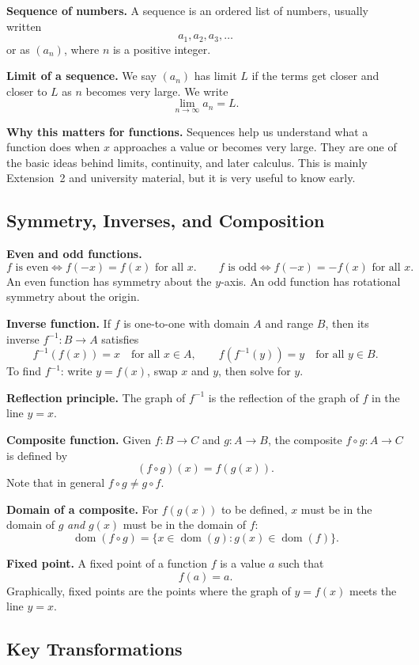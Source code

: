 \documentclass[12pt]{article}
\theoremstyle{definition}
\begin{document}
\textbf{Sequence of numbers.} A sequence is an ordered list of numbers, usually written
\[
a_1,a_2,a_3,\dots
\]
or as $(a_n)$, where $n$ is a positive integer.

\textbf{Limit of a sequence.} We say $(a_n)$ has limit $L$ if the terms get closer and closer to $L$ as $n$ becomes very large. We write
\[
\lim_{n\to\infty} a_n = L.
\]

\textbf{Why this matters for functions.} Sequences help us understand what a function does when $x$ approaches a value or becomes very large. They are one of the basic ideas behind limits, continuity, and later calculus. This is mainly Extension~2 and university material, but it is very useful to know early.

\subsection{Symmetry, Inverses, and Composition}

\textbf{Even and odd functions.}
\[
f \text{ is even} \iff f(-x) = f(x) \text{ for all } x.
\qquad
f \text{ is odd} \iff f(-x) = -f(x) \text{ for all } x.
\]
An even function has symmetry about the $y$-axis. An odd function has rotational symmetry about the origin.

\textbf{Inverse function.} If $f$ is one-to-one with domain $A$ and range $B$, then its inverse $f^{-1}: B \to A$ satisfies
\[
f^{-1}(f(x)) = x \quad \text{for all } x \in A,
\qquad
f(f^{-1}(y)) = y \quad \text{for all } y \in B.
\]
To find $f^{-1}$: write $y = f(x)$, swap $x$ and $y$, then solve for $y$.

\textbf{Reflection principle.} The graph of $f^{-1}$ is the reflection of the graph of $f$ in the line $y = x$.

\textbf{Composite function.} Given $f: B \to C$ and $g: A \to B$, the composite $f \circ g: A \to C$ is defined by
\[
(f \circ g)(x) = f(g(x)).
\]
Note that in general $f \circ g \neq g \circ f$.

\textbf{Domain of a composite.} For $f(g(x))$ to be defined, $x$ must be in the domain of $g$ \emph{and} $g(x)$ must be in the domain of $f$:
\[
\operatorname{dom}(f \circ g) = \{x \in \operatorname{dom}(g) : g(x) \in \operatorname{dom}(f)\}.
\]

\textbf{Fixed point.} A fixed point of a function $f$ is a value $a$ such that
\[
f(a)=a.
\]
Graphically, fixed points are the points where the graph of $y=f(x)$ meets the line $y=x$.

\subsection{Key Transformations}
\end{document}
